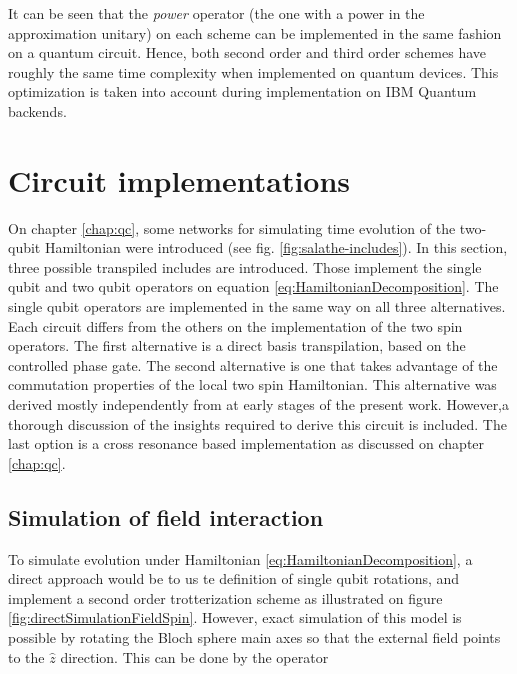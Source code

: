   It can be seen that the \textit{power} operator (the one with a power in the approximation unitary) on each scheme can be implemented in the same fashion on a quantum circuit. Hence, both second order and third order schemes have roughly the same time complexity when implemented on quantum devices. This optimization is taken into account during implementation on IBM Quantum backends.
  
  

\section{Circuit implementations}
\label{sec:MainCircuits}
  
  On chapter \ref{chap:qc}, some networks for simulating time evolution of the two-qubit Hamiltonian were introduced (see fig. \ref{fig:salathe-includes}). In this section, three possible transpiled includes are introduced. Those implement the single qubit and two qubit operators on equation \ref{eq:HamiltonianDecomposition}. The single qubit operators are implemented in the same way on all three alternatives. Each circuit differs from the others on the implementation of the two spin operators. The first alternative is a direct basis transpilation, based on the controlled phase gate. The second alternative is one that takes advantage of the commutation properties of the local two spin Hamiltonian. This alternative was derived mostly independently from \cite{BellUniversalCartan} at early stages of the present work. However,a thorough discussion of the insights required to derive this circuit is included. The last option is a cross resonance based implementation as discussed on chapter \ref{chap:qc}.

  \subsection{Simulation of field interaction}
  \label{subsec:fieldInteractionCircuit}

    To simulate evolution under Hamiltonian \ref{eq:HamiltonianDecomposition}, a direct approach would be to us te definition of single qubit rotations, and implement a second order trotterization scheme as illustrated on figure \ref{fig:directSimulationFieldSpin}. However, exact simulation of this model is possible by rotating the Bloch sphere main axes so that the external field points to the $\hat{z}$ direction. This can be done by the operator

